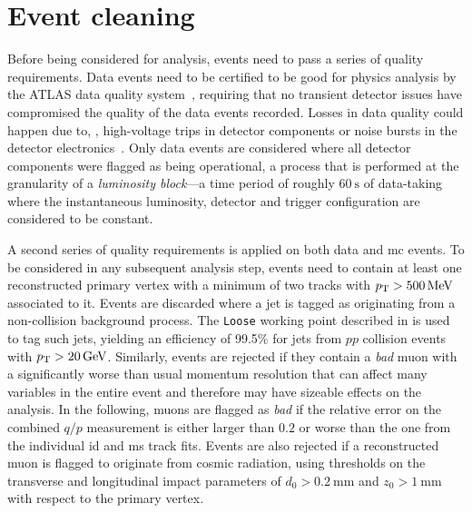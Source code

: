 \section{Event cleaning}

Before being considered for analysis, events need to pass a series of quality requirements.
Data events need to be certified to be good for physics analysis by the ATLAS data quality system~\cite{DAPR-2018-01}, requiring that no transient detector issues have compromised the quality of the data events recorded.
Losses in data quality could happen due to, \eg, high-voltage trips in detector components or noise bursts in the detector electronics~\cite{DAPR-2018-01}.
Only data events are considered where all detector components were flagged as being operational, a process that is performed at the granularity of a \textit{luminosity block}---a time period of roughly $\SI{60}{\second}$ of data-taking where the instantaneous luminosity, detector and trigger configuration are considered to be constant. 

A second series of quality requirements is applied on both data and \gls{mc} events.
To be considered in any subsequent analysis step, events need to contain at least one reconstructed primary vertex with a minimum of two tracks with $\pt > \SI{500}{\MeV}$ associated to it.
Events are discarded where a jet is tagged as originating from a non-collision background process. The \texttt{Loose} working point described in \cite{ATLAS-CONF-2015-029} is used to tag such jets, yielding an efficiency of 99.5\% for jets from $pp$ collision events with $\pt>\SI{20}{\GeV}$.
Similarly, events are rejected if they contain a \textit{bad} muon with a significantly worse than usual momentum resolution that can affect many variables in the entire event and therefore may have sizeable effects on the analysis.
In the following, muons are flagged as \textit{bad} if the relative error on the combined $q/p$ measurement is either larger than $0.2$ or worse than the one from the individual \gls{id} and \gls{ms} track fits.
Events are also rejected if a reconstructed muon is flagged to originate from cosmic radiation, using thresholds on the transverse and longitudinal impact parameters of $d_0 > \SI{0.2}{\milli\meter}$ and $z_0 > \SI{1}{\milli\meter}$ with respect to the primary vertex.



